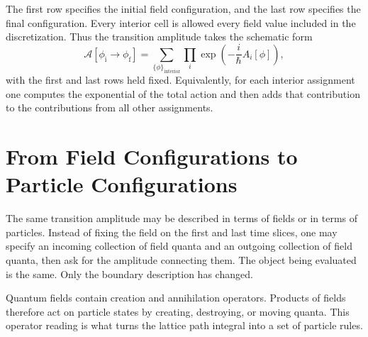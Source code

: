 The first row specifies the initial field configuration, and the last row specifies the final configuration. Every interior cell is allowed every field value included in the discretization. Thus the transition amplitude takes the schematic form
\begin{equation}
\mathcal{A}\!\left[\phi_{\mathrm{i}}\rightarrow\phi_{\mathrm{f}}\right]
=
\sum_{\{\phi\}_{\mathrm{interior}}}
\prod_i\exp\!\left(-\frac{i}{\hbar}A_i[\phi]\right),
\end{equation}
with the first and last rows held fixed. Equivalently, for each interior assignment one computes the exponential of the total action and then adds that contribution to the contributions from all other assignments.

\section{From Field Configurations to Particle Configurations}

The same transition amplitude may be described in terms of fields or in terms of particles. Instead of fixing the field on the first and last time slices, one may specify an incoming collection of field quanta and an outgoing collection of field quanta, then ask for the amplitude connecting them. The object being evaluated is the same. Only the boundary description has changed.

Quantum fields contain creation and annihilation operators. Products of fields therefore act on particle states by creating, destroying, or moving quanta. This operator reading is what turns the lattice path integral into a set of particle rules.

\begin{classroomqa}
\end{classroomqa}

